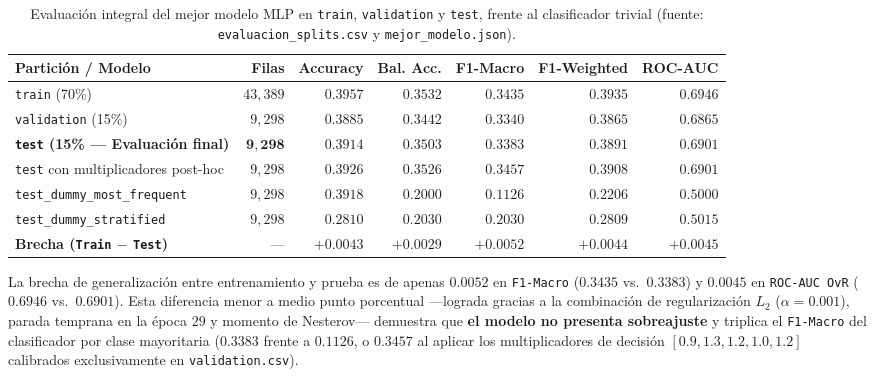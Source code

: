 \documentclass[11pt,a4paper]{article}
\newcommand{\code}[1]{\texttt{\small #1}}
\begin{document}
\begin{table}[H]
\centering
\caption{Evaluación integral del mejor modelo MLP en \code{train}, \code{validation} y \code{test}, frente al clasificador trivial (fuente: \code{evaluacion\_splits.csv} y \code{mejor\_modelo.json}).}
\footnotesize
\setlength{\tabcolsep}{4pt}
\begin{tabularx}{\textwidth}{>{\raggedright\arraybackslash}X rrrrrr}
\toprule
\textbf{Partición / Modelo} & \textbf{Filas} & \textbf{Accuracy} & \textbf{Bal. Acc.} & \textbf{F1-Macro} & \textbf{F1-Weighted} & \textbf{ROC-AUC} \\
\midrule
\code{train} (70\%) & $43{,}389$ & $0.3957$ & $0.3532$ & $0.3435$ & $0.3935$ & $0.6946$ \\
\code{validation} (15\%) & $9{,}298$ & $0.3885$ & $0.3442$ & $0.3340$ & $0.3865$ & $0.6865$ \\
\textbf{\code{test} (15\% --- Evaluación final)} & $\mathbf{9{,}298}$ & $\mathbf{0.3914}$ & $\mathbf{0.3503}$ & $\mathbf{0.3383}$ & $\mathbf{0.3891}$ & $\mathbf{0.6901}$ \\
\code{test} con multiplicadores post-hoc & $9{,}298$ & $0.3926$ & $0.3526$ & $\mathbf{0.3457}$ & $0.3908$ & $0.6901$ \\
\midrule
\code{test\_dummy\_most\_frequent} & $9{,}298$ & $0.3918$ & $0.2000$ & $0.1126$ & $0.2206$ & $0.5000$ \\
\code{test\_dummy\_stratified} & $9{,}298$ & $0.2810$ & $0.2030$ & $0.2030$ & $0.2809$ & $0.5015$ \\
\midrule
\textbf{Brecha (\code{Train} $-$ \code{Test})} & --- & $\mathbf{+0.0043}$ & $\mathbf{+0.0029}$ & $\mathbf{+0.0052}$ & $\mathbf{+0.0044}$ & $\mathbf{+0.0045}$ \\
\bottomrule
\end{tabularx}
\end{table}

La brecha de generalización entre entrenamiento y prueba es de apenas $\mathbf{0.0052}$ en \code{F1-Macro} ($0.3435$ vs.\ $0.3383$) y $\mathbf{0.0045}$ en \code{ROC-AUC OvR} ($0.6946$ vs.\ $0.6901$). Esta diferencia menor a medio punto porcentual —lograda gracias a la combinación de regularización $L_2$ ($\alpha = 0.001$), parada temprana en la época $29$ y momento de Nesterov— demuestra que \textbf{el modelo no presenta sobreajuste} y triplica el \code{F1-Macro} del clasificador por clase mayoritaria ($0.3383$ frente a $0.1126$, o $0.3457$ al aplicar los multiplicadores de decisión $[0.9, 1.3, 1.2, 1.0, 1.2]$ calibrados exclusivamente en \code{validation.csv}).
\end{document}
